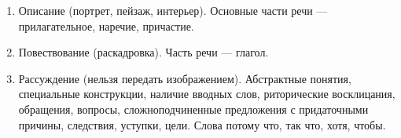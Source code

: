 \documentclass{article}
\begin{document}
\begin{enumerate}
\item
  Описание (портрет, пейзаж, интерьер). Основные части речи --- прилагательное, наречие, причастие.
\item
  Повествование (раскадровка). Часть речи --- глагол.
\item
  Рассуждение (нельзя передать изображением). Абстрактные понятия, специальные конструкции, наличие вводных слов,
  риторические восклицания, обращения, вопросы, сложноподчиненные предложения с придаточными причины, следствия,
  уступки, цели. Слова потому что, так что, хотя, чтобы.
\end{enumerate}
\end{document}
